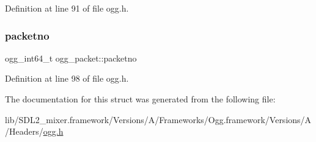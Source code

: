 Definition at line 91 of file ogg.\+h.

\mbox{\label{structogg__packet_a60e257b3a8f843135474457197c65a45}} 
\subsubsection{\texorpdfstring{packetno}{packetno}}
{\footnotesize\ttfamily ogg\+\_\+int64\+\_\+t ogg\+\_\+packet\+::packetno}



Definition at line 98 of file ogg.\+h.



The documentation for this struct was generated from the following file\+:\begin{DoxyCompactItemize}
\item 
lib/\+S\+D\+L2\+\_\+mixer.\+framework/\+Versions/\+A/\+Frameworks/\+Ogg.\+framework/\+Versions/\+A/\+Headers/\mbox{\hyperlink{ogg_8h}{ogg.\+h}}\end{DoxyCompactItemize}
